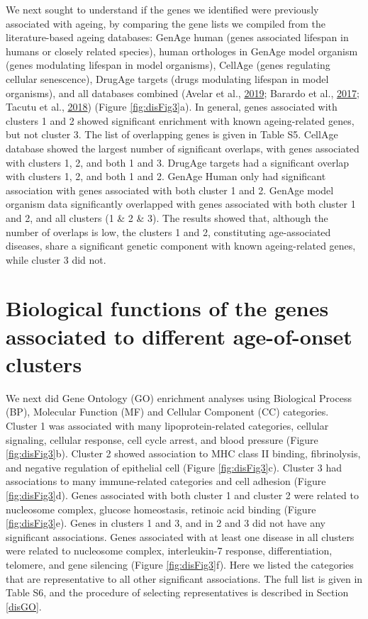 \documentclass[12pt,twoside]{unicam}
\begin{document}
We next sought to understand if the genes we identified were previously associated with ageing, by comparing the gene lists we compiled from the literature-based ageing databases: GenAge human (genes associated lifespan in humans or closely related species), human orthologes in GenAge model organism (genes modulating lifespan in model organisms), CellAge (genes regulating cellular senescence), DrugAge targets (drugs modulating lifespan in model organisms), and all databases combined (Avelar et al., \protect\hyperlink{ref-Avelar2019}{2019}; Barardo et al., \protect\hyperlink{ref-Barardo2017}{2017}; Tacutu et al., \protect\hyperlink{ref-Tacutu2018}{2018}) (Figure \ref{fig:disFig3}a). In general, genes associated with clusters 1 and 2 showed significant enrichment with known ageing-related genes, but not cluster 3. The list of overlapping genes is given in Table S5. CellAge database showed the largest number of significant overlaps, with genes associated with clusters 1, 2, and both 1 and 3. DrugAge targets had a significant overlap with clusters 1, 2, and both 1 and 2. GenAge Human only had significant association with genes associated with both cluster 1 and 2. GenAge model organism data significantly overlapped with genes associated with both cluster 1 and 2, and all clusters (1 \& 2 \& 3). The results showed that, although the number of overlaps is low, the clusters 1 and 2, constituting age-associated diseases, share a significant genetic component with known ageing-related genes, while cluster 3 did not.

\hypertarget{biological-functions-of-the-genes-associated-to-different-age-of-onset-clusters}{%
\section{Biological functions of the genes associated to different age-of-onset clusters}\label{biological-functions-of-the-genes-associated-to-different-age-of-onset-clusters}}

We next did Gene Ontology (GO) enrichment analyses using Biological Process (BP), Molecular Function (MF) and Cellular Component (CC) categories. Cluster 1 was associated with many lipoprotein-related categories, cellular signaling, cellular response, cell cycle arrest, and blood pressure (Figure \ref{fig:disFig3}b). Cluster 2 showed association to MHC class II binding, fibrinolysis, and negative regulation of epithelial cell (Figure \ref{fig:disFig3}c). Cluster 3 had associations to many immune-related categories and cell adhesion (Figure \ref{fig:disFig3}d). Genes associated with both cluster 1 and cluster 2 were related to nucleosome complex, glucose homeostasis, retinoic acid binding (Figure \ref{fig:disFig3}e). Genes in clusters 1 and 3, and in 2 and 3 did not have any significant associations. Genes associated with at least one disease in all clusters were related to nucleosome complex, interleukin-7 response, differentiation, telomere, and gene silencing (Figure \ref{fig:disFig3}f). Here we listed the categories that are representative to all other significant associations. The full list is given in Table S6, and the procedure of selecting representatives is described in Section \ref{disGO}.
\end{document}

